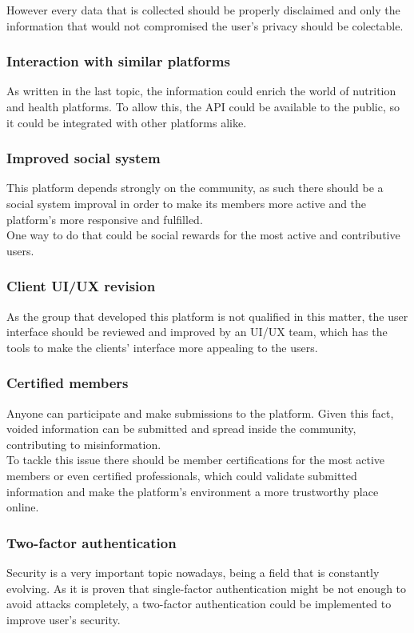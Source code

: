 However every data that is collected should be properly disclaimed and only the information that
would not compromised the user's privacy should be colectable.

\subsubsection{Interaction with similar platforms}

As written in the last topic, the information could enrich the world of nutrition and health platforms.
To allow this, the API could be available to the public, so it could be integrated with other platforms
alike.\\

\subsubsection{Improved social system}

This platform depends strongly on the community, as such there should be a social system improval in order
to make its members more active and the platform's more responsive and fulfilled.\\

One way to do that could be social rewards for the most active and contributive users.

\subsubsection{Client UI/UX revision}

As the group that developed this platform is not qualified in this matter, 
the user interface should be reviewed and improved by an UI/UX team, which has the tools to make the clients' 
interface more appealing to the users.

\subsubsection{Certified members}

Anyone can participate and make submissions to the platform. Given this fact, voided information
can be submitted and spread inside the community, contributing to misinformation.\\

To tackle this issue there should be member certifications for the most active members or even
certified professionals, which could validate submitted information and make the platform's
environment a more trustworthy place online.

\subsubsection{Two-factor authentication}

Security is a very important topic nowadays, being a field that is constantly evolving. As it is proven
that single-factor authentication might be not enough to avoid attacks completely, a two-factor authentication
could be implemented to improve user's security.

